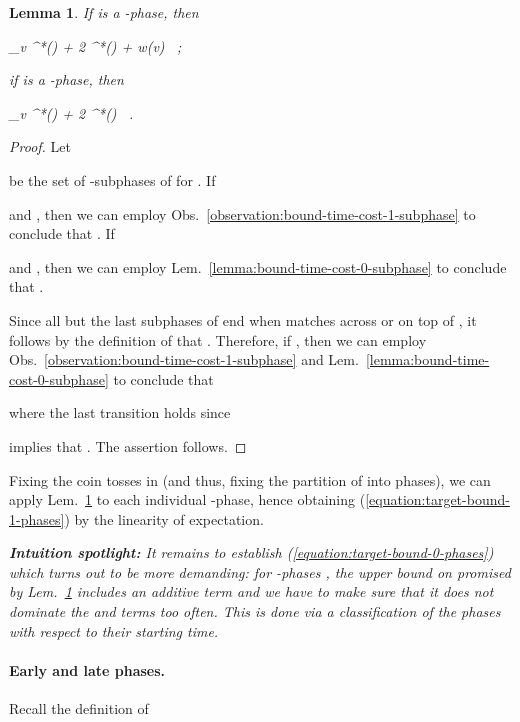 \documentclass[11pt]{article}
\def\LongVersion{}
\def\LongVersionEnd{}
\newtheorem{lemma}[theorem]{Lemma}
\theoremstyle{definition}
\theoremstyle{plain}
\newtheorem{lemma}[theorem]{Lemma}
\theoremstyle{definition}
\theoremstyle{plain}
\newtheorem{lemma}{Lemma}[section]
\theoremstyle{definition}
\theoremstyle{plain}
\newenvironment{IntuitionSpotlight}[0]
{\par \setlength{\leftskip}{0.5\parindent}\setlength{\rightskip}{0.5\parindent}\noindent\itshape\textbf{Intuition spotlight:}}
{\par\ignorespacesafterend}
\newcommand{\Lem}{Lem.}
\newcommand{\Obs}{Obs.}
\newcommand{\Expect}{\mathbb{E}}
\newcommand{\adv}[1]{{#1}^{*}}
\begin{document}
\begin{lemma} \label{lemma:0-and-1-phases}
If  is a -phase, then
\begin{MathMaybe}
\Expect_{v} \left[ \tau(\phi) \right]
\leq
\adv{\tau}(\phi) + 2 \adv{\sigma}(\phi) + w(v) \, ;
\end{MathMaybe}
if  is a -phase, then
\begin{MathMaybe}
\Expect_{v} \left[ \tau(\phi) \right]
\leq
\adv{\tau}(\phi) + 2 \adv{\sigma}(\phi) \, .
\end{MathMaybe}
\end{lemma}
\LongVersion \begin{proof}
Let

be the set of -subphases of  for .
If

and
,
then we can employ \Obs{}~\ref{observation:bound-time-cost-1-subphase} to
conclude that
.
If

and
,
then we can employ \Lem{}~\ref{lemma:bound-time-cost-0-subphase} to conclude
that
.

Since all but the last subphases of  end when  matches across
or on top of , it follows by the definition of  that
.
Therefore, if
,
then we can employ \Obs{}~\ref{observation:bound-time-cost-1-subphase} and
\Lem{}~\ref{lemma:bound-time-cost-0-subphase} to conclude that

where the last transition holds since

implies that
.
The assertion follows.
\end{proof}
\LongVersionEnd 

Fixing the coin tosses in  (and thus, fixing the partition of
 into phases), we can apply \Lem{}~\ref{lemma:0-and-1-phases}
to each individual -phase, hence obtaining
(\ref{equation:target-bound-1-phases}) by the linearity of expectation.

\begin{IntuitionSpotlight}
It remains to establish (\ref{equation:target-bound-0-phases}) which turns out
to be more demanding:
for -phases , the upper bound on  promised by
\Lem{}~\ref{lemma:0-and-1-phases} includes an additive  term and we have
to make sure that it does not dominate the  and
 terms too often.
This is done via a classification of the phases with respect to
their starting time.
\end{IntuitionSpotlight}

\paragraph{Early and late phases.}
Recall the definition of
\end{document}
